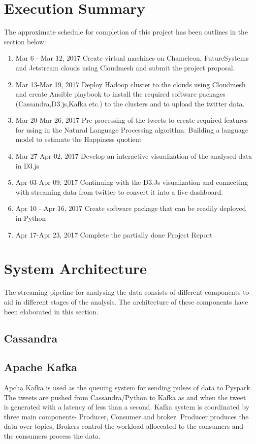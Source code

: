\documentclass[9pt,twocolumn,twoside]{../../styles/osajnl}
\begin{document}
\section{Execution Summary}
The approximate schedule for completion of this project has been outlines in the section below:
\begin{enumerate}
\item {Mar 6 - Mar 12, 2017} Create virtual machines on Chameleon, FutureSystems and Jetstream clouds using Cloudmesh and submit the project proposal.
\item {Mar 13-Mar 19, 2017} Deploy Hadoop cluster to the clouds using Cloudmesh and create Ansible playbook to install the required software packages (Cassandra,D3.js,Kafka etc.) to the clusters  and to upload the twitter data.
\item {Mar 20-Mar 26, 2017} Pre-processing of the tweets to create required features for using in the Natural Language Processing algorithm. Building a language model to estimate the Happiness quotient
\item {Mar 27-Apr 02, 2017} Develop an interactive visualization of the analysed data in D3.js
\item {Apr 03-Apr 09, 2017} Continuing with the D3.Js visualization and connecting with streaming data from twitter to convert it into a live dashboard.
\item {Apr 10 - Apr 16, 2017} Create software package that can be readily deployed in Python
\item {Apr 17-Apr 23, 2017} Complete the partially done  Project Report
\end{enumerate}

\section{System Architecture}
The streaming pipeline for analysing the data consists of different components to aid in different stages of the analysis. The architecture of these components have been elaborated in this section.
\subsection{Cassandra}
\subsection{Apache Kafka}
Apcha Kafka is used as the queuing system for sending pulses of data to Pyspark. The tweets are pushed from Cassandra/Python to Kafka as and when the tweet is generated with a latency of less than a second. Kafka system is coordinated by three main components- Producer, Consumer and broker. Producer produces the data over topics, Brokers control the workload alloccated to the consumers and the consumers process the data. 
\end{document}
